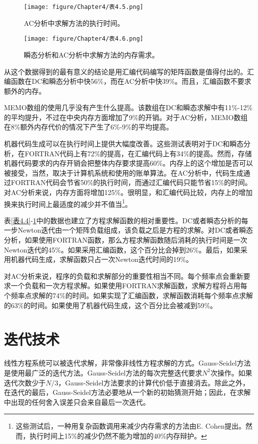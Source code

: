 \begin{figure}[htbp]
\small
    \centering
    \texttt{[image: figure/Chapter4/表4.5.png]}
    \caption{AC分析中求解方法的执行时间。}
    \label{表4.5}
\end{figure}

\begin{figure}[htbp]
\small
    \centering
    \texttt{[image: figure/Chapter4/表4.6.png]}
    \caption{瞬态分析和AC分析中求解方法的内存需求。}
    \label{表4.6}
\end{figure}

从这个数据得到的最有意义的结论是用汇编代码编写的矩阵函数是值得付出的。汇编函数在DC和瞬态分析中快56\%，而在AC分析中快39\%。而且，汇编函数不要求额外的内存。

MEMO数组的使用几乎没有产生什么提高。该数组在DC和瞬态求解中有11\%-12\%的平均提升，不过在中央内存方面增加了9\%的开销。对于AC分析，MEMO数组在8\%额外内存代价的情况下产生了6\%-9\%的平均提高。

机器代码生成可以在执行时间上提供大幅度改善。这些测试表明对于DC和瞬态分析，在FORTRAN代码上有72\%的提高，在汇编代码上有34\%的提高。然而，存储机器代码要求的内存开销会把整体内存要求提高60\%。内存上的这个增加是否可以被接受，当然，取决于计算机系统和使用的账单算法。在AC分析中，代码生成通过FORTRAN代码会节省50\%的执行时间，而通过汇编代码只能节省15\%的时间。对AC分析来说，内存方面将增加125\%。很明显，和汇编代码比较，内存上的增加换来执行时间上最适度的减少并不值当\footnote{这些测试后，一种用复杂函数调用来减少内存需求的方法由E. Cohen提出。然而，执行时间上15\%的减少仍然不能为增加的40\%内存辩护。}。

表\ref{表4.4}-\ref{表4.5}中的数据也建立了方程求解函数的相对重要性。DC或者瞬态分析的每一步Newton迭代由一个矩阵负载组成，该负载之后是方程的求解。对DC或者瞬态分析，如果使用FORTRAN函数，那么方程求解函数随后消耗的执行时间是一次Newton迭代的45\%。如果采用汇编函数，这个百分比会掉到26\%。最后，如果采用机器代码生成，求解函数只占一次Newton迭代时间的19\%。

对AC分析来说，程序的负载和求解部分的重要性相当不同。每个频率点会重新要求一个负载和一次方程求解。如果使用FORTRAN求解函数，求解方程将占用每个频率点求解的74\%的时间。如果实现了汇编函数，求解函数消耗每个频率点求解的63\%的时间。如果使用了机器代码生成，这个百分比会被减到59\%。

\section{迭代技术}
线性方程系统可以被迭代求解，非常像非线性方程求解的方式。Gauss-Seidel方法\cite{ref-49}是使用最广泛的迭代方法。Gauss-Seidel方法的每次完整迭代要求$N^2$次操作。如果迭代次数少于$N/3$，Gauss-Seidel方法要求的计算代价低于直接消去。除此之外，在迭代的最后，Gauss-Seidel方法必要地从一个新的初始猜测开始；因此，在求解中出现的任何舍入误差只会来自最后一次迭代。

